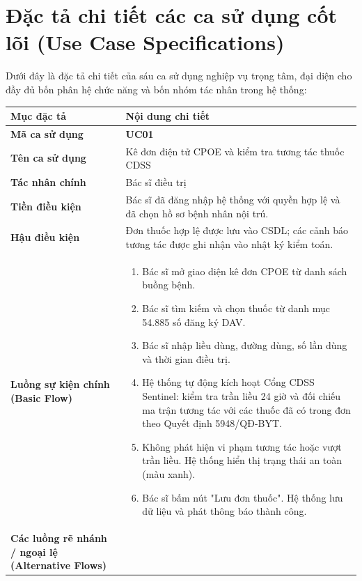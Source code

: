 \section{Đặc tả chi tiết các ca sử dụng cốt lõi (Use Case Specifications)}
\label{sec:use_case_specifications}

Dưới đây là đặc tả chi tiết của sáu ca sử dụng nghiệp vụ trọng tâm, đại diện cho đầy đủ bốn phân hệ chức năng và bốn nhóm tác nhân trong hệ thống:

\begin{table}[htbp]
\centering
\small
\begin{tabularx}{\textwidth}{L{3.2cm} Y}
\toprule
\textbf{Mục đặc tả} & \textbf{Nội dung chi tiết} \\
\midrule
\textbf{Mã ca sử dụng} & \textbf{UC01} \\
\textbf{Tên ca sử dụng} & Kê đơn điện tử CPOE và kiểm tra tương tác thuốc CDSS \\
\textbf{Tác nhân chính} & Bác sĩ điều trị \\
\textbf{Tiền điều kiện} & Bác sĩ đã đăng nhập hệ thống với quyền hợp lệ và đã chọn hồ sơ bệnh nhân nội trú. \\
\textbf{Hậu điều kiện} & Đơn thuốc hợp lệ được lưu vào CSDL; các cảnh báo tương tác được ghi nhận vào nhật ký kiểm toán. \\
\midrule
\textbf{Luồng sự kiện chính (Basic Flow)} & 
\begin{enumerate}[leftmargin=1.2em, topsep=0pt, partopsep=0pt]
    \item Bác sĩ mở giao diện kê đơn CPOE từ danh sách buồng bệnh.
    \item Bác sĩ tìm kiếm và chọn thuốc từ danh mục 54.885 số đăng ký DAV.
    \item Bác sĩ nhập liều dùng, đường dùng, số lần dùng và thời gian điều trị.
    \item Hệ thống tự động kích hoạt Cổng CDSS Sentinel: kiểm tra trần liều 24 giờ và đối chiếu ma trận tương tác với các thuốc đã có trong đơn theo Quyết định 5948/QĐ-BYT.
    \item Không phát hiện vi phạm tương tác hoặc vượt trần liều. Hệ thống hiển thị trạng thái an toàn (màu xanh).
    \item Bác sĩ bấm nút "Lưu đơn thuốc". Hệ thống lưu dữ liệu và phát thông báo thành công.
\end{enumerate} \\
\midrule
\textbf{Các luồng rẽ nhánh / ngoại lệ (Alternative Flows)} & 
\begin{itemize}[leftmargin=1.2em, topsep=0pt, partopsep=0pt]

\end{itemize}
\end{tabularx}
\end{table}
